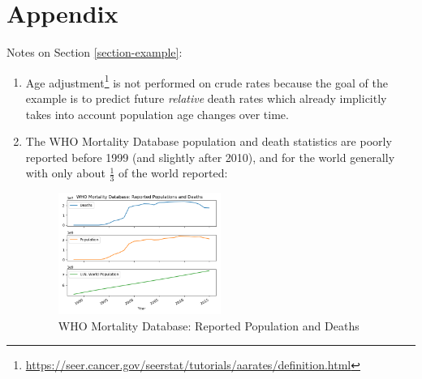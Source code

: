 \documentclass[12pt, a4paper, twocolumn]{article}
\begin{document}
\vfill\eject



\newpage
\clearpage

\section{Appendix}

Notes on Section \ref{section-example}:

\begin{enumerate}
  \item Age adjustment\footnote{\scriptsize{\url{https://seer.cancer.gov/seerstat/tutorials/aarates/definition.html}}} is not performed on crude rates because the goal of the example is to predict future \textit{relative} death rates which already implicitly takes into account population age changes over time.
  \item The WHO Mortality Database population and death statistics are poorly reported before 1999 (and slightly after 2010), and for the world generally with only about $\frac{1}{3}$ of the world reported:
    \begin{figure}[H]
      \centering
      \includegraphics[width=0.5\textwidth]{results/who_mortality_db_population_deaths.png}
      \caption{WHO Mortality Database: Reported Population and Deaths}
    \end{figure}
\end{enumerate}
\end{document}
